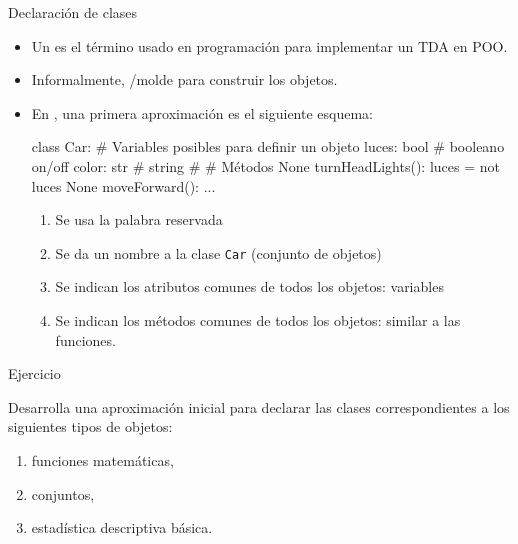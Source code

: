 \documentclass[10pt,envcountsect,spanish]{beamer}
\begin{document}
\begin{frame}[fragile]{Declaración de clases} 


\begin{itemize}
\item Un  es el término usado en programación para implementar un TDA en POO.

\item Informalmente, /molde para construir los objetos.

\item En , una primera aproximación es el siguiente esquema:

{\small
\begin{code}[]%
class Car:
    # Variables posibles para definir un objeto
    luces: bool  # booleano on/off
    color: str   # string
    # 
    # Métodos
    None turnHeadLights():
        luces = not luces
    None moveForward():
        ...
\end{code}
}


\begin{enumerate}
\item Se usa la palabra reservada 
\item Se da un nombre a la clase \texttt{Car} (conjunto de objetos)
\item Se indican los atributos comunes de todos los objetos: variables
\item Se indican los métodos comunes de todos los objetos: similar a las funciones.
\end{enumerate}
\end{itemize}
\end{frame}




\begin{frame}{Ejercicio} 

\begin{example}

Desarrolla una aproximación inicial para declarar las clases correspondientes a los siguientes tipos de objetos:
\begin{enumerate}
\item funciones matemáticas,
\item conjuntos,
\item estadística descriptiva básica.
\end{enumerate}
\end{example}

\end{frame}
\end{document}
